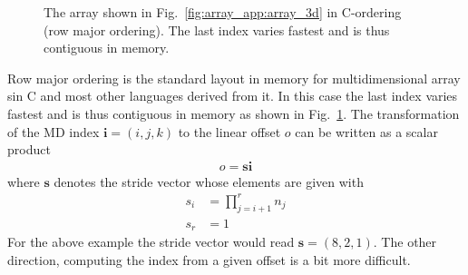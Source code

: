 \begin{figure}[tb]
\centering
\begin{minipage}{0.45\linewidth}
\centering
{}
\end{minipage}
\hfill
\begin{minipage}{0.4\linewidth}
\caption{{\small\label{fig:array_app:array_3d_corder}
The array shown in Fig.~\ref{fig:array_app:array_3d} in C-ordering (row major
ordering). The last index varies fastest and is thus contiguous in memory. 
}}
\end{minipage}
\end{figure}
Row major ordering is the standard layout in memory for multidimensional array
sin C and most other languages derived from it. In this case the last index
varies fastest and is thus contiguous in memory as shown in
Fig.~\ref{fig:array_app:array_3d_corder}. 
The transformation of the MD index $\mathbf{i}=(i,j,k)$ to the linear offset 
$o$ can be written as a scalar product 
\begin{align}\label{eq:array_app:offset_formula}
    o = \mathbf{s}\mathbf{i}
\end{align}
where $\mathbf{s}$ denotes the stride vector whose elements are given with
\begin{align}
    s_i &= \prod_{j=i+1}^r n_j \\
    s_r &= 1
\end{align}
For the above example the stride vector would read $\mathbf{s}=(8,2,1)$. 
The other direction, computing the index from a given offset is a bit more
difficult. 

